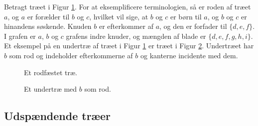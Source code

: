 \begin{exmp}
Betragt træet i Figur \ref{eksempel_rootedtree}. 
For at eksemplificere terminologien, så er roden af træet $a$, og $a$ er forælder til $b$ og $c$, hvilket vil sige, at $b$ og $c$ er børn til $a$, og $b$ og $c$ er hinandens søskende. 
Knuden $b$ er efterkommer af $a$, og den er forfader til $\lbrace d, e, f \rbrace$. 
I grafen er $a$, $b$ og $c$ grafens indre knuder, og mængden af blade er $\lbrace d, e, f, g, h, i \rbrace$. 
Et eksempel på en undertræ af træet i Figur \ref{eksempel_rootedtree} er træet i Figur \ref{eksempel_rootedsubtree}.
Undertræet har $b$ som rod og indeholder efterkommerne af $b$ og kanterne incidente med dem. 
\end{exmp}

\begin{figure}[h]
\centering
{}
\caption{Et rodfæstet træ.} 
\label{eksempel_rootedtree}
\end{figure}

\begin{figure}[h]
\centering
{}
\caption{Et undertræ med $b$ som rod.} 
\label{eksempel_rootedsubtree}
\end{figure}

\subsection{Udspændende træer}
